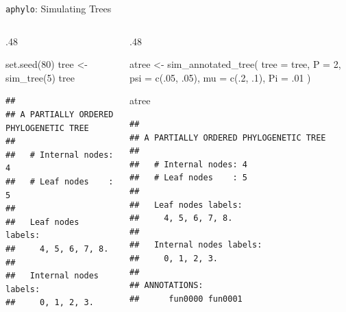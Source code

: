 \documentclass[9pt,ignorenonframetext,]{beamer}
\newenvironment{Shaded}{\begin{snugshade}}{\end{snugshade}}
\newcommand{\KeywordTok}[1]{\textcolor[rgb]{0.94,0.87,0.69}{#1}}
\newcommand{\DataTypeTok}[1]{\textcolor[rgb]{0.87,0.87,0.75}{#1}}
\newcommand{\DecValTok}[1]{\textcolor[rgb]{0.86,0.86,0.80}{#1}}
\newcommand{\StringTok}[1]{\textcolor[rgb]{0.80,0.58,0.58}{#1}}
\newcommand{\NormalTok}[1]{\textcolor[rgb]{0.80,0.80,0.80}{#1}}
\def\begincols{\begin{columns}[T]}
\def\begincol{\begin{column}[T]}
\def\endcol{\end{column}}
\def\endcols{\end{columns}}
\begin{document}
\begin{frame}[fragile,t]{\texttt{aphylo}: Simulating Trees}

\begincols

\begincol{.48\textwidth}

\footnotesize

\begin{Shaded}
\begin{Highlighting}[]
\KeywordTok{set.seed}\NormalTok{(}\DecValTok{80}\NormalTok{)}
\NormalTok{tree <-}\StringTok{ }\KeywordTok{sim_tree}\NormalTok{(}\DecValTok{5}\NormalTok{)}
\NormalTok{tree}
\end{Highlighting}
\end{Shaded}

\begin{verbatim}
## 
## A PARTIALLY ORDERED PHYLOGENETIC TREE
## 
##   # Internal nodes: 4
##   # Leaf nodes    : 5
## 
##   Leaf nodes labels: 
##     4, 5, 6, 7, 8.
## 
##   Internal nodes labels:
##     0, 1, 2, 3.
\end{verbatim}

\normalsize

\endcol

\begincol{.48\textwidth}

\footnotesize

\begin{Shaded}
\begin{Highlighting}[]
\NormalTok{atree <-}\StringTok{ }\KeywordTok{sim_annotated_tree}\NormalTok{(}
  \DataTypeTok{tree =}\NormalTok{ tree, }\DataTypeTok{P =} \DecValTok{2}\NormalTok{,}
  \DataTypeTok{psi  =} \KeywordTok{c}\NormalTok{(.}\DecValTok{05}\NormalTok{, .}\DecValTok{05}\NormalTok{),}
  \DataTypeTok{mu   =} \KeywordTok{c}\NormalTok{(.}\DecValTok{2}\NormalTok{, .}\DecValTok{1}\NormalTok{),}
  \DataTypeTok{Pi   =}\NormalTok{ .}\DecValTok{01}
\NormalTok{  )}

\NormalTok{atree}
\end{Highlighting}
\end{Shaded}

\begin{verbatim}
## 
## A PARTIALLY ORDERED PHYLOGENETIC TREE
## 
##   # Internal nodes: 4
##   # Leaf nodes    : 5
## 
##   Leaf nodes labels: 
##     4, 5, 6, 7, 8.
## 
##   Internal nodes labels:
##     0, 1, 2, 3.
## 
## ANNOTATIONS:
##      fun0000 fun0001
\end{verbatim}

\normalsize

\endcol

\endcols

\end{frame}
\end{document}
